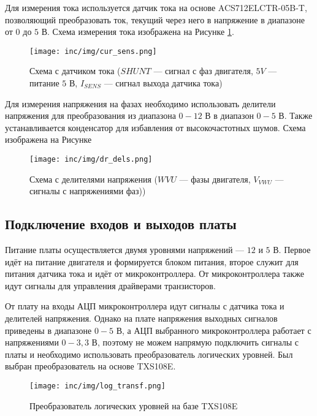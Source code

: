 Для измерения тока используется датчик тока на основе ACS712ELCTR-05B-T, позволяющий преобразовать ток, текущий через него в напряжение в диапазоне от $0$ до $5$ В. Схема измерения тока изображена на Рисунке \ref{pic:cur_sens}.

\begin{figure}[!h]
\centering
\texttt{[image: inc/img/cur\_sens.png]}
\caption{Схема с датчиком тока ($SHUNT$ --- сигнал с фаз двигателя, $5V$ --- питание $5$ В, $I_{SENS}$ --- сигнал выхода датчика тока)}
\label{pic:cur_sens}
\end{figure}

Для измерения напряжения на фазах необходимо использовать делители напряжения для преобразования из диапазона $0-12$ В в диапазон $0-5$ В. Также устанавливается конденсатор для избавления от высокочастотных шумов. Схема изображена на Рисунке 

\begin{figure}[!h]
\centering
\texttt{[image: inc/img/dr\_dels.png]}
\caption{Схема с делителями напряжения ($WVU$ --- фазы двигателя, $V_{VWU}$ --- сигналы с напряжениями фаз))}
\label{pic:dr_dels}
\end{figure}

\subsection{Подключение входов и выходов платы}

Питание платы осуществляется двумя уровнями напряжений --- $12$ и $5$ В. Первое идёт на питание двигателя и формируется блоком питания, второе служит для питания датчика тока и идёт от микроконтроллера. От микроконтроллера также идут сигналы для управления драйверами транзисторов.

От плату на входы АЦП микроконтроллера идут сигналы с датчика тока и делителей напряжения. Однако на плате напряжения выходных сигналов приведены в диапазоне $0-5$ В, а АЦП выбранного микроконтроллера работает с напряжениями $0-3,3$ В, поэтому не можем напрямую подключить сигналы с платы и необходимо использовать преобразователь логических уровней. Был выбран преобразователь на основе TXS108E.

\begin{figure}[!h]
\centering
\texttt{[image: inc/img/log\_transf.png]}
\caption{Преобразователь логических уровней на базе TXS108E}
\label{pic:log_transf}
\end{figure}

